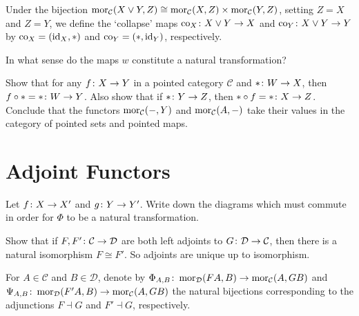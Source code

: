\item Under the bijection $\operatorname{mor}_{\mathcal{C}}(X\lor Y,Z) \cong\operatorname{mor}_{\mathcal{C}}(X,Z) \times \operatorname{mor}_{\mathcal{C}}(Y, Z)$, setting $Z=X$ and $Z=Y$, we define the `collapse' maps $\mathrm{co}_X\colon X\lor Y\to X$ and $\mathrm{co}_Y\colon X\lor Y\to Y$ by $\mathrm{co}_X=(\mathrm{id}_X,*)$ and $\mathrm{co}_Y=(*,\mathrm{id}_Y)$, respectively.
\een
\es

\bx
In what sense do the maps $w$ constitute a natural transformation?
\ex

\bs
\es

\bp
Show that for any $f\colon X \to Y$ in a pointed category $\mathcal{C}$ and $*\colon W\to X$, then $f\circ * = *\colon W\to Y$. Also show that if $*\colon Y\to Z$, then $*\circ f=*\colon X\to Z$. Conclude that the functors $\operatorname{mor}_{\mathcal{C}}(-,Y)$ and $\operatorname{mor}_{\mathcal{C}}(A,-)$ take their values in the category of pointed sets and pointed maps.
\ep

\bs

\es



\section{Adjoint Functors}

\bx
Let $f \colon X \to X'$ and $g \colon Y \to Y'$. Write down the diagrams which must commute in order for $\Phi$ to be a natural transformation.
\ex

\bs
\es

\begin{extrap}
Show that if $F, F' \colon \mathcal{C} \to \mathcal{D}$ are both left adjoints to $G \colon \mathcal{D}\to\mathcal{C}$, then there is a natural isomorphism $F \cong F'$. So adjoints are unique up to isomorphism.
\end{extrap}

\bs
For $A\in \mathcal{C}$ and $B\in\mathcal{D}$, denote by $\Phi_{A,B}\colon\operatorname{mor}_{\mathcal{D}}(FA,B)\to\operatorname{mor}_{\mathcal{C}}(A,GB)$ and $\Psi_{A,B}\colon\operatorname{mor}_{\mathcal{D}}(F'A,B)\to\operatorname{mor}_{\mathcal{C}}(A,GB)$ the natural bijections corresponding to the adjunctions $F\dashv G$ and $F'\dashv G$, respectively.

